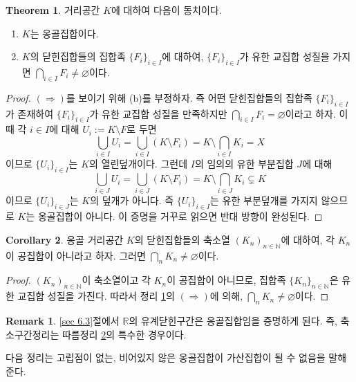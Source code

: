 \documentclass[11pt]{book}
\numberwithin{equation}{chapter}
\def\NN{\mathbb{N}}
\def\RR{\mathbb{R}}
\theoremstyle{definition}
\newtheorem{thm}{Theorem}[section]
\newtheorem{cor}[thm]{Corollary}
\newtheorem*{rem}{Remark}
\newenvironment{enum}
	{\begin{enumerate}[label=(\alph*), leftmargin=2\parindent]}
	{\end{enumerate}}
\begin{document}
\begin{thm} \label{thm 6.1.6}
    거리공간 \(K\)에 대하여 다음이 동치이다.
    \begin{enum}
        \item \(K\)는 옹골집합이다. 
        \item \(K\)의 닫힌집합들의 집합족 \(\{F_i\}_{i \in I}\)에 대하여, \(\{F_i\}_{i \in I}\)가 유한 교집합 성질을 가지면 \(\bigcap_{i \in I} F_i \ne \varnothing\)이다.
    \end{enum}
\end{thm}
\begin{proof}
    \((\Rightarrow)\)를 보이기 위해 (b)를 부정하자. 즉 어떤 닫힌집합들의 집합족 \(\{F_i\}_{i \in I}\)가 존재하여 \(\{F_i\}_{i \in I}\)가 유한 교집합 성질을 만족하지만 \(\bigcap_{i \in I} F_i = \varnothing\)이라고 하자. 이때 각 \(i \in I\)에 대해 \(U_i := K \setminus F\)로 두면
    \[
    \bigcup_{i \in I} U_i = \bigcup_{i \in I} (K \setminus F_i) = K \setminus \bigcap_{i \in I} K_i = X    
    \]
    이므로 \(\{U_i\}_{i \in I}\)는 \(K\)의 열린덮개이다. 그런데 \(I\)의 임의의 유한 부분집합 \(J\)에 대해
    \[
    \bigcup_{i \in J} U_i = \bigcup_{i \in J} (K \setminus F_i) = K \setminus \bigcap_{i \in J} K_i \subsetneq K     
    \]
    이므로 \(\{U_i\}_{i \in J}\)는 \(K\)의 덮개가 아니다. 즉 \(\{U_i\}_{i \in I}\)는 유한 부분덮개를 가지지 않으므로 \(K\)는 옹골집합이 아니다. 이 증명을 거꾸로 읽으면 반대 방향이 완성된다.
\end{proof}

\begin{cor} \label{cor 6.1.7}
    옹골 거리공간 \(K\)의 닫힌집합들의 축소열 \((K_n)_{n \in \NN}\)에 대하여, 각 \(K_n\)이 공집합이 아니라고 하자. 그러면 \(\bigcap_n K_n \ne \varnothing\)이다.
\end{cor}
\begin{proof}
    \((K_n)_{n \in \NN}\)이 축소열이고 각 \(K_n\)이 공집합이 아니므로, 집합족 \(\{K_n\}_{n \in \NN}\)은 유한 교집합 성질을 가진다. 따라서 정리 \ref{thm 6.1.6}의 \((\Rightarrow)\)에 의해, \(\bigcap_n K_n \ne \varnothing\)이다.
\end{proof}

\begin{rem}
    \ref{sec 6.3}절에서 \(\RR\)의 유계닫힌구간은 옹골집합임을 증명하게 된다. 즉, 축소구간정리는 따름정리 \ref{cor 6.1.7}의 특수한 경우이다.
\end{rem}

다음 정리는 고립점이 없는, 비어있지 않은 옹골집합이 가산집합이 될 수 없음을 말해 준다.
\end{document}
